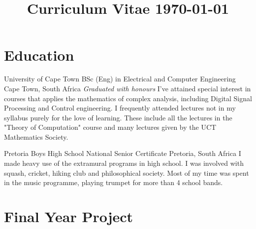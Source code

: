 \documentclass[11pt,a4paper,sans]{moderncv}
\title{Curriculum Vitae \newline\null\hfill\small\today}
\begin{document}
\makecvtitle


\section{Education}

{University of Cape Town}
{BSc (Eng) in Electrical and Computer Engineering}
{\newline Cape Town, South Africa}
{\textit{Graduated with honours}}
{I've attained special interest in courses that applies the mathematics of complex
analysis, including Digital Signal Processing and Control engineering. I
frequently attended lectures not in my syllabus purely for the love of learning.
These include all the lectures in the "Theory of Computation" course and many
lectures given by the UCT Mathematics Society.}

\vspace{2mm}
{Pretoria Boys High School}
{National Senior Certificate}
{\newline Pretoria, South Africa}
{}
{I made heavy use of the extramural programs in high school. I was involved with
squash, cricket, hiking club and philosophical society. Most of my time was spent
in the music programme, playing trumpet for more than 4 school bands.}

\section{Final Year Project}
\end{document}
